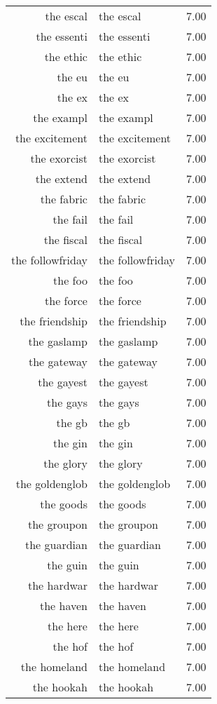 \begin{table}[ht]
\begin{tabular}{rlr}
  the escal & the escal & 7.00 \\ 
  the essenti & the essenti & 7.00 \\ 
  the ethic & the ethic & 7.00 \\ 
  the eu & the eu & 7.00 \\ 
  the ex & the ex & 7.00 \\ 
  the exampl & the exampl & 7.00 \\ 
  the excitement & the excitement & 7.00 \\ 
  the exorcist & the exorcist & 7.00 \\ 
  the extend & the extend & 7.00 \\ 
  the fabric & the fabric & 7.00 \\ 
  the fail & the fail & 7.00 \\ 
  the fiscal & the fiscal & 7.00 \\ 
  the followfriday & the followfriday & 7.00 \\ 
  the foo & the foo & 7.00 \\ 
  the force & the force & 7.00 \\ 
  the friendship & the friendship & 7.00 \\ 
  the gaslamp & the gaslamp & 7.00 \\ 
  the gateway & the gateway & 7.00 \\ 
  the gayest & the gayest & 7.00 \\ 
  the gays & the gays & 7.00 \\ 
  the gb & the gb & 7.00 \\ 
  the gin & the gin & 7.00 \\ 
  the glory & the glory & 7.00 \\ 
  the goldenglob & the goldenglob & 7.00 \\ 
  the goods & the goods & 7.00 \\ 
  the groupon & the groupon & 7.00 \\ 
  the guardian & the guardian & 7.00 \\ 
  the guin & the guin & 7.00 \\ 
  the hardwar & the hardwar & 7.00 \\ 
  the haven & the haven & 7.00 \\ 
  the here & the here & 7.00 \\ 
  the hof & the hof & 7.00 \\ 
  the homeland & the homeland & 7.00 \\ 
  the hookah & the hookah & 7.00 \\ 

\end{tabular}
\end{table}

